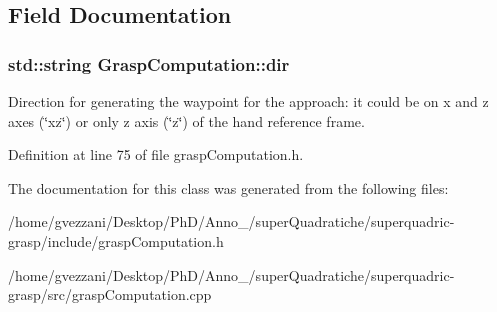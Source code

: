 \subsection{Field Documentation}
\subsubsection[{\texorpdfstring{dir}{dir}}]{\setlength{\rightskip}{0pt plus 5cm}std\+::string Grasp\+Computation\+::dir\hspace{0.3cm}{\ttfamily [protected]}}\label{classGraspComputation_a362c9280e813cfcbb1b0b4153fabc88c}


Direction for generating the waypoint for the approach\+: it could be on x and z axes (\char`\"{}xz\char`\"{}) or only z axis (\char`\"{}z\char`\"{}) of the hand reference frame. 



Definition at line 75 of file grasp\+Computation.\+h.



The documentation for this class was generated from the following files\+:\begin{DoxyCompactItemize}
\item 
/home/gvezzani/\+Desktop/\+Ph\+D/\+Anno\+\_/super\+Quadratiche/superquadric-\/grasp/include/grasp\+Computation.\+h\item 
/home/gvezzani/\+Desktop/\+Ph\+D/\+Anno\+\_/super\+Quadratiche/superquadric-\/grasp/src/grasp\+Computation.\+cpp\end{DoxyCompactItemize}
